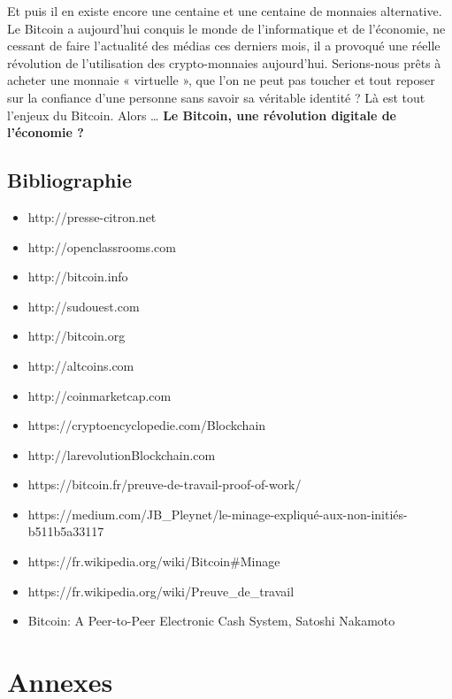 \documentclass{bredele} %
\begin{document}
    \newline
    \newline
    Et puis il en existe encore une centaine et une centaine de monnaies alternative.
    \newline
    \newline
    Le Bitcoin a aujourd’hui conquis le monde de l’informatique et de l’économie, ne cessant de faire l’actualité des médias ces derniers mois, il a provoqué une réelle révolution de l’utilisation des crypto-monnaies aujourd’hui. Serions-nous prêts à acheter une monnaie « virtuelle », que l’on ne peut pas toucher et tout reposer sur la confiance d’une personne sans savoir sa véritable identité ? Là est tout l’enjeux du Bitcoin. Alors … \textbf{Le Bitcoin, une révolution digitale de l’économie ?}
    \chapter*{Bibliographie}
    \begin{itemize}
        \item http://presse-citron.net
        \item http://openclassrooms.com
        \item http://bitcoin.info
        \item http://sudouest.com
        \item http://bitcoin.org
        \item http://altcoins.com
        \item http://coinmarketcap.com
        \item https://cryptoencyclopedie.com/Blockchain
        \item http://larevolutionBlockchain.com
        \item https://bitcoin.fr/preuve-de-travail-proof-of-work/
        \item https://medium.com/JB\_Pleynet/le-minage-expliqué-aux-non-initiés-b511b5a33117
        \item https://fr.wikipedia.org/wiki/Bitcoin\#Minage
        \item https://fr.wikipedia.org/wiki/Preuve\_de\_travail
        \item Bitcoin: A Peer-to-Peer Electronic Cash System, Satoshi Nakamoto
    \end{itemize}
    \part{Annexes}
    
    
\end{document}

